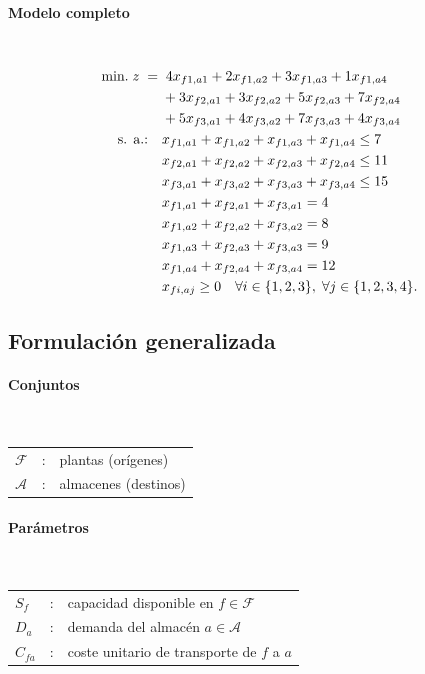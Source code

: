 \paragraph{Modelo completo}\mbox{}\\
\begin{align}
\mbox{min.}\; z \;=\;
&\; 4x_{f1,a1} + 2x_{f1,a2} + 3x_{f1,a3} + 1x_{f1,a4} \notag \\
&+ 3x_{f2,a1} + 3x_{f2,a2} + 5x_{f2,a3} + 7x_{f2,a4} \notag \\
&+ 5x_{f3,a1} + 4x_{f3,a2} + 7x_{f3,a3} + 4x_{f3,a4} \notag \\
\mbox{s. a.:}\quad
& x_{f1,a1} + x_{f1,a2} + x_{f1,a3} + x_{f1,a4} \le 7 \notag \\
& x_{f2,a1} + x_{f2,a2} + x_{f2,a3} + x_{f2,a4} \le 11 \notag \\
& x_{f3,a1} + x_{f3,a2} + x_{f3,a3} + x_{f3,a4} \le 15 \notag \\
& x_{f1,a1} + x_{f2,a1} + x_{f3,a1} = 4 \notag \\
& x_{f1,a2} + x_{f2,a2} + x_{f3,a2} = 8 \notag \\
& x_{f1,a3} + x_{f2,a3} + x_{f3,a3} = 9 \notag \\
& x_{f1,a4} + x_{f2,a4} + x_{f3,a4} = 12 \notag \\
& x_{f i, a j} \ge 0 \quad \forall i \in \{1,2,3\},\; \forall j \in \{1,2,3,4\}. \notag
\end{align}

\subsection{Formulación generalizada}

\paragraph{Conjuntos}\mbox{}\\
\begin{tabular}{l c l}
    $\mathcal{F}$  & : & plantas (orígenes) \\
    $\mathcal{A}$  & : & almacenes (destinos) \\
\end{tabular}

\paragraph{Parámetros}\mbox{}\\
\begin{tabular}{l c l}
    $S_f$   & : & capacidad disponible en $f \in \mathcal{F}$ \\
    $D_a$   & : & demanda del almacén $a \in \mathcal{A}$ \\
    $C_{fa}$ & : & coste unitario de transporte de $f$ a $a$ \\
\end{tabular}

